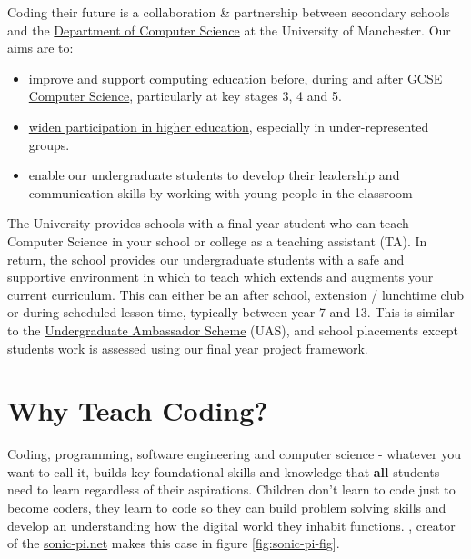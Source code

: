 \documentclass[
  12pt,
]{book}
\providecommand{\tightlist}{%
  \setlength{\itemsep}{0pt}\setlength{\parskip}{0pt}}
\begin{document}
Coding their future is a collaboration \& partnership between secondary schools and the \href{https://www.cs.manchester.ac.uk/}{Department of Computer Science} at the University of Manchester. Our aims are to:

\begin{itemize}
\tightlist
\item
  improve and support computing education before, during and after \href{https://www.bbc.co.uk/bitesize/subjects/z34k7ty}{GCSE Computer Science}, particularly at key stages 3, 4 and 5. \citep{shutdownrestart, afterthereboot, cse, cambridgegcse}
\item
  \href{https://www.manchester.ac.uk/discover/social-responsibility/widening-participation/}{widen participation in higher education}, especially in under-represented groups. \citep{assir, classceiling, nicebutdim, breakintoelite}
\item
  enable our undergraduate students to develop their leadership and communication skills by working with young people in the classroom
\end{itemize}

The University provides schools with a final year student who can teach Computer Science in your school or college as a teaching assistant (TA). In return, the school provides our undergraduate students with a safe and supportive environment in which to teach which extends and augments your current curriculum. This can either be an after school, extension / lunchtime club or during scheduled lesson time, typically between year 7 and 13. This is similar to the \href{https://en.wikipedia.org/wiki/Undergraduate_Ambassadors_Scheme}{Undergraduate Ambassador Scheme} (UAS), \citep{uas, Cooper2005} and school placements \citep{Moller2019} except students work is assessed using our final year project framework. \citep{COMP30030, COMP30040}

\section{Why Teach Coding?}\label{whycode}

Coding, programming, software engineering and computer science - whatever you want to call it, builds key foundational skills and knowledge that \textbf{all} students need to learn regardless of their aspirations. Children don't learn to code just to become coders, they learn to code so they can build problem solving skills and develop an understanding how the digital world they inhabit functions. \citep{peytoncode, kidscode}, creator of the \href{https://sonic-pi.net/}{sonic-pi.net} makes this case in figure \ref{fig:sonic-pi-fig}.
\end{document}
